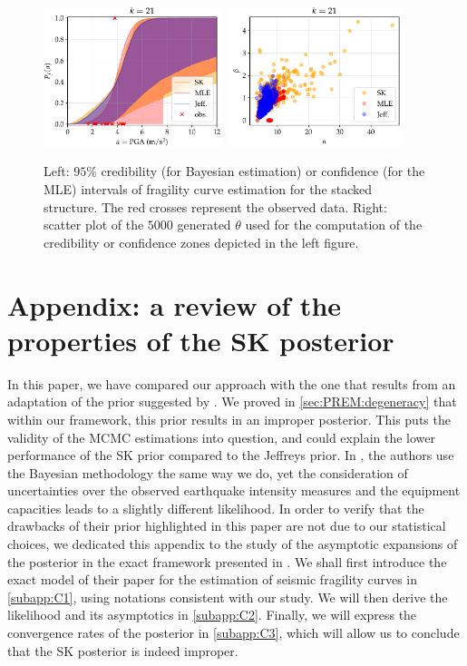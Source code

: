 \begin{figure}[!h]
    \centering
    \includegraphics[width=5.2cm]{figures/PREM/EDEN/PGA21.pdf}\hspace*{0.5cm}
    \includegraphics[width=5.2cm]{figures/PREM/EDEN/PGA21scatter.pdf}
    \caption{Left: $95\%$ credibility (for Bayesian estimation) or confidence (for the MLE) intervals of fragility curve estimation for the stacked structure. The red crosses represent the observed data. Right: scatter plot of the $5000$ generated $\theta$ used for the computation of the credibility or confidence zones depicted in the left figure.}
    \label{fig:PREM:eden-results}
\end{figure}


\section{Appendix: a review of the properties of the SK posterior}\label{app:SKreview}



In this paper, we have compared our approach with the one that results from an adaptation of the prior suggested by \citet{straub_improved_2008}. We proved in \cref{sec:PREM:degeneracy} that within our framework, this prior results in an improper posterior. This puts the validity of the MCMC estimations into question, and could explain the lower performance of the SK prior compared to the Jeffreys prior. 
In \cite{straub_improved_2008}, the authors use the Bayesian methodology the same way we do, yet the consideration of uncertainties over the observed earthquake intensity measures and the equipment capacities leads to a slightly different likelihood.
In order to verify that the drawbacks of their prior highlighted in this paper are not due to our statistical choices, we dedicated this appendix to the study of the asymptotic expansions of the posterior in the exact framework presented in \cite{straub_improved_2008}.
We shall first introduce the exact model of their paper for the estimation of seismic fragility curves in \cref{subapp:C1}, using notations consistent with our study. We will then derive the likelihood and its asymptotics in \cref{subapp:C2}. Finally, we will express the convergence rates of the posterior in \cref{subapp:C3}, which will allow us to conclude that the SK posterior is indeed improper.

